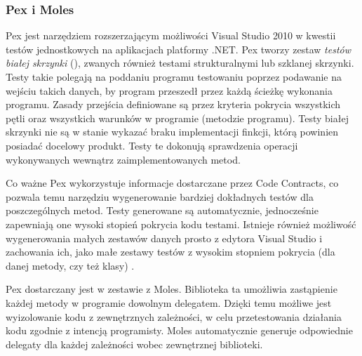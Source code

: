 \subsubsection{Pex i Moles\label{04:pex}}
Pex jest narzędziem rozszerzającym możliwości Visual Studio 2010 w kwestii testów jednostkowych na aplikacjach platformy .NET. Pex tworzy zestaw \emph{testów białej skrzynki} (), zwanych również testami strukturalnymi lub szklanej skrzynki. Testy takie polegają na poddaniu programu testowaniu poprzez podawanie na wejściu takich danych, by program przeszedł przez każdą ścieżkę wykonania programu. Zasady przejścia definiowane są przez kryteria pokrycia wszystkich pętli oraz wszystkich warunków w programie (metodzie programu). Testy białej skrzynki nie są w stanie wykazać braku implementacji finkcji, którą powinien posiadać docelowy produkt. Testy te dokonują sprawdzenia operacji wykonywanych wewnątrz zaimplementowanych metod. 

Co ważne Pex wykorzystuje informacje dostarczane przez Code Contracts, co pozwala temu narzędziu wygenerowanie bardziej dokładnych testów dla poszczególnych metod. Testy generowane są automatycznie, jednocześnie zapewniają one wysoki stopień pokrycia kodu testami. Istnieje również możliwość wygenerowania małych zestawów danych prosto z edytora Visual Studio i zachowania ich, jako małe zestawy testów z wysokim stopniem pokrycia (dla danej metody, czy też klasy) .

Pex dostarczany jest w zestawie z Moles. Biblioteka ta umożliwia zastąpienie każdej metody w programie dowolnym delegatem. Dzięki temu możliwe jest wyizolowanie kodu z zewnętrznych zależności, w celu przetestowania działania kodu zgodnie z intencją programisty. Moles automatycznie generuje odpowiednie delegaty dla każdej zależności wobec zewnętrznej biblioteki.